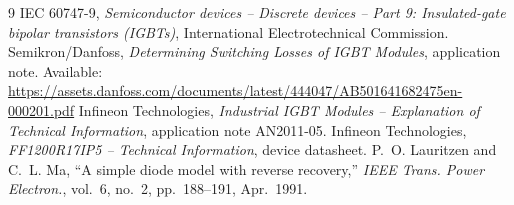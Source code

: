 \documentclass[11pt,a4paper]{article}
\begin{document}
\begin{thebibliography}{9}
 IEC 60747-9, \emph{Semiconductor devices -- Discrete devices -- Part 9:
Insulated-gate bipolar transistors (IGBTs)}, International Electrotechnical Commission.
 Semikron/Danfoss, \emph{Determining Switching Losses of IGBT Modules},
application note. Available:
\url{https://assets.danfoss.com/documents/latest/444047/AB501641682475en-000201.pdf}
 Infineon Technologies, \emph{Industrial IGBT Modules -- Explanation of
Technical Information}, application note AN2011-05.
 Infineon Technologies, \emph{FF1200R17IP5 -- Technical Information},
device datasheet.
 P.~O. Lauritzen and C.~L. Ma, ``A simple diode model with reverse
recovery,'' \emph{IEEE Trans. Power Electron.}, vol.~6, no.~2, pp.~188--191, Apr.~1991.
\end{thebibliography}
\end{document}
